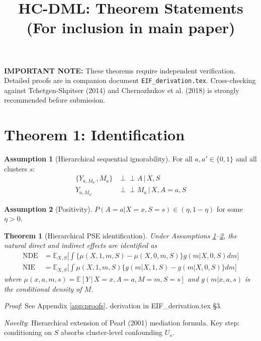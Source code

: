 \documentclass[11pt]{article}
\title{HC-DML: Theorem Statements\\
\small (For inclusion in main paper)}
\date{}
\theoremstyle{plain}
\newtheorem{theorem}{Theorem}
\theoremstyle{definition}
\newtheorem{assumption}{Assumption}
\newcommand{\E}{\mathbb{E}}
\newcommand{\indep}{\perp\!\!\!\perp}
\newcommand{\given}{\,|\,}
\begin{document}
\maketitle

\textbf{IMPORTANT NOTE:} These theorems require independent verification. 
Detailed proofs are in companion document \texttt{EIF\_derivation.tex}. 
Cross-checking against Tchetgen-Shpitser (2014) and Chernozhukov et al. (2018) 
is strongly recommended before submission.

\section{Theorem 1: Identification}

\begin{assumption}[Hierarchical sequential ignorability]
\label{assump:hsi}
For all $a, a' \in \{0,1\}$ and all clusters $s$:
\begin{align*}
    \{Y_{a, M_{a'}}, M_a\} &\indep A \given X, S \\
    Y_{a, M_{a'}} &\indep M_a \given X, A=a, S
\end{align*}
\end{assumption}

\begin{assumption}[Positivity]
\label{assump:pos}
$P(A=a | X=x, S=s) \in (\eta, 1-\eta)$ for some $\eta > 0$.
\end{assumption}

\begin{theorem}[Hierarchical PSE identification]
\label{thm:1}
Under Assumptions \ref{assump:hsi}--\ref{assump:pos}, the natural direct and indirect effects are identified as
\begin{align*}
    \mathrm{NDE} &= \E_{X, S}\!\bigg[\!\int \big\{\mu(X, 1, m, S) - \mu(X, 0, m, S)\big\} g(m | X, 0, S) dm\bigg] \\
    \mathrm{NIE} &= \E_{X, S}\!\bigg[\!\int \mu(X, 1, m, S) \{g(m | X, 1, S) - g(m | X, 0, S)\} dm\bigg]
\end{align*}
where $\mu(x, a, m, s) = \E[Y \given X{=}x, A{=}a, M{=}m, S{=}s]$ and $g(m | x, a, s)$ is the conditional density of $M$.
\end{theorem}

\textit{Proof}: See Appendix \ref{app:proofs}, derivation in EIF\_derivation.tex §3.

\textit{Novelty}: Hierarchical extension of Pearl (2001) mediation formula. Key step: conditioning on $S$ absorbs cluster-level confounding $U_s$.
\end{document}
